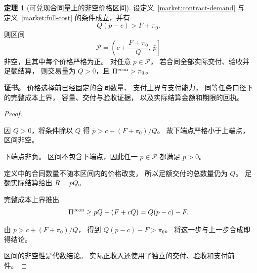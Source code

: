 \documentclass[UTF8,12pt,a4paper,openany,fontset=none,zihao=false]{ctexrep}
\theoremstyle{definition}
\newtheorem{theorem}{定理}[chapter]
\newenvironment{certificate}{\par\noindent\textbf{证书。}\ignorespaces}{\par}
\newcommand{\1}{\mathbf 1}
\begin{document}
\begin{theorem}[可兑现合同量上的非空价格区间]
\label{market:positive-price}
设定义~\ref{market:contract-demand} 与
定义~\ref{market:full-cost} 的条件成立，并有
\[
 Q(\bar p-c)>F+\pi_0.
\]
则区间
\[
 \mathcal P
 =\left(c+\frac{F+\pi_0}{Q},\,\bar p\right]
\]
非空，且其中每个价格严格为正。
对任意 \(p\in\mathcal P\)，
若合同全部实际交付、验收并足额结算，
则交易量为 \(Q>0\)，且
\(\Pi^{\rm econ}>\pi_0\)。
\end{theorem}
\begin{certificate}
价格选择前已经固定的合同数量、
支付上界与支付能力，
同等任务口径下的完整成本上界，
容量、交付与验收证据，
以及实际结算金额和期限的回执。
\end{certificate}
\begin{proof}
\begin{semanticsteps}
\item 因 \(Q>0\)，将条件除以 \(Q\) 得
\(\bar p>c+(F+\pi_0)/Q\)。
故下端点严格小于上端点，区间非空。
\item 下端点非负。
区间不包含下端点，因此任一
\(p\in\mathcal P\) 都满足 \(p>0\)。
\item 定义中的合同数量不随本区间内的价格改变，
所以足额交付的总数量仍为 \(Q\)。
足额实际结算给出 \(R=pQ\)。
\item 完整成本上界推出
\[
 \Pi^{\rm econ}
 \ge pQ-(F+cQ)
 =Q(p-c)-F.
\]
\item 由 \(p>c+(F+\pi_0)/Q\)，
得到 \(Q(p-c)-F>\pi_0\)。
将这一步与上一步合成即得结论。
\end{semanticsteps}
区间的非空性是代数结论。
实际正收入还使用了独立的交付、验收和支付前件。
\end{proof}
\end{document}
